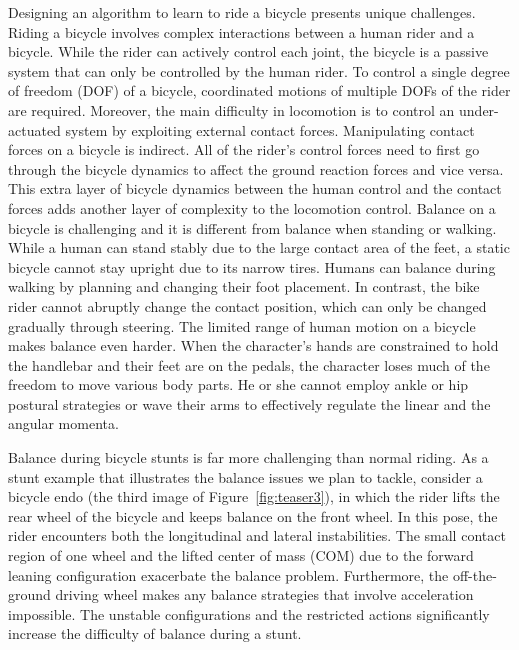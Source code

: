 Designing an algorithm to learn to ride a bicycle presents unique challenges. Riding a bicycle involves complex interactions between a human rider and a bicycle. While the rider can actively control each joint, the bicycle is a passive system that can only be controlled by the human rider. To control a single degree of freedom (DOF) of a bicycle, coordinated motions of multiple DOFs of the rider are required. Moreover, the main difficulty in locomotion is to control an under-actuated system by exploiting external contact forces. Manipulating contact forces on a bicycle is indirect. All of the rider's control forces need to first go through the bicycle dynamics to affect the ground reaction forces and vice versa. This extra layer of bicycle dynamics between the human control and the contact forces adds another layer of complexity to the locomotion control. Balance on a bicycle is challenging and it is different from balance when standing or walking. While a human can stand stably due to the large contact area of the feet, a static bicycle cannot stay upright due to its narrow tires. Humans can balance during walking by planning and changing their foot placement. In contrast, the bike rider cannot abruptly change the contact position, which can only be changed gradually through steering. The limited range of human motion on a bicycle makes balance even harder. When the character's hands are constrained to hold the handlebar and their feet are on the pedals, the character loses much of the freedom to move various body parts. He or she cannot employ ankle or hip postural strategies or wave their arms to effectively regulate the linear and the angular momenta.

Balance during bicycle stunts is far more challenging than normal riding. As a stunt example that illustrates the balance issues we plan to tackle, consider a bicycle endo (the third image of Figure~\ref{fig:teaser3}), in which the rider lifts the rear wheel of the bicycle and keeps balance on the front wheel. In this pose, the rider encounters both the longitudinal and lateral instabilities. The small contact region of one wheel and the lifted center of mass (COM) due to the forward leaning configuration exacerbate the balance problem. Furthermore, the off-the-ground driving wheel makes any balance strategies that involve acceleration impossible. The unstable configurations and the restricted actions significantly increase the difficulty of balance during a stunt.

